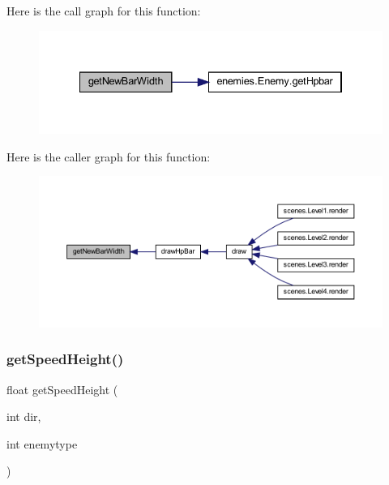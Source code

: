 Here is the call graph for this function\+:
\nopagebreak
\begin{figure}[H]
\begin{center}
\leavevmode
\includegraphics[width=334pt]{classmanagers_1_1_enemy_manager_ac01087314c8b4df0d2304a3596493393_cgraph}
\end{center}
\end{figure}
Here is the caller graph for this function\+:
\nopagebreak
\begin{figure}[H]
\begin{center}
\leavevmode
\includegraphics[width=350pt]{classmanagers_1_1_enemy_manager_ac01087314c8b4df0d2304a3596493393_icgraph}
\end{center}
\end{figure}
\mbox{\label{classmanagers_1_1_enemy_manager_a263c83da9aebeac50b60770fb847f331}} 
\subsubsection{\texorpdfstring{get\+Speed\+Height()}{getSpeedHeight()}}
{\footnotesize\ttfamily float get\+Speed\+Height (\begin{DoxyParamCaption}\item[{int}]{dir,  }\item[{int}]{enemytype }\end{DoxyParamCaption})}



